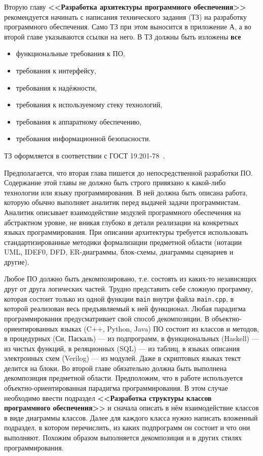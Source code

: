 \documentclass[14pt]{extarticle}
\begin{document}
Вторую главу {\bf <<Разработка архитектуры программного обеспечения>>} рекомендуется начинать с написания технического задания (ТЗ) на разработку программного обеспечения. Само ТЗ  при этом выносится в приложение А, а во второй главе указываются ссылки на него. В ТЗ должны быть изложены {\bf все} 
\begin{itemize}[label=$\bullet$, wide]
\item функциональные требования к ПО, 
\item требования к интерфейсу,
\item требования к надёжности,
\item требования к используемому стеку технологий,
\item требования к аппаратному обеспечению,
\item требования информационной безопасности.
\end{itemize}

ТЗ оформляется в соответствии с ГОСТ 19.201-78~\cite{gost19201}. 

Предполагается, что вторая глава пишется до непосредственной разработки ПО. Содержание этой главы не должно быть строго привязано к какой-либо технологии или языку программирования. В ней должна быть описана работа, которую обычно выполняет аналитик перед выдачей задачи программистам. Аналитик описывает взаимодействие модулей программного обеспечения на абстрактном уровне, не вникая глубоко в детали реализации на конкретных языках программирования. %
При описании архитектуры требуется использовать стандартизированные методики формализации предметной области (нотации UML, IDEF0, DFD, ER-диаграммы, блок-схемы, диаграммы сценариев и другие). 

Любое ПО должно быть декомпозировано, т.е. состоять из каких-то независящих друг от друга логических частей. Трудно представить себе сложную программу, которая состоит только из одной функции \texttt{main} внутри файла \texttt{main.cpp}, в которой реализован весь предъявляемый к ней функционал. Любая парадигма программирования предусматривает свой способ декомпозиции. В объектно-ориентирован\-ных языках (C++, Python, Java) ПО состоит из классов и методов, в процедурных (Си, Паскаль) --- из подпрограмм, в функциональных (Haskell) --- из чистых функций, в реляционных (SQL) --- из таблиц, в языках описания электронных схем (Veri\-log) --- из модулей. Даже в скриптовых языках текст делится на блоки. Во второй главе обязательно должна быть выполнена декомпозиция предметной области. Предположим, что в работе используется объектно-ориентированная парадигма программирования. В этом случае необходимо ввести подраздел {\bf <<Разработка структуры классов программного обеспечения>>} и сначала описать в нём взаимодействие классов в виде диаграммы классов. Далее для каждого класса нужно написать вложенный подраздел, в котором перечислить, из каких подпрограмм он состоит и что они выполняют. Похожим образом выполняется декомпозиция и в других стилях программирования.
\end{document}
